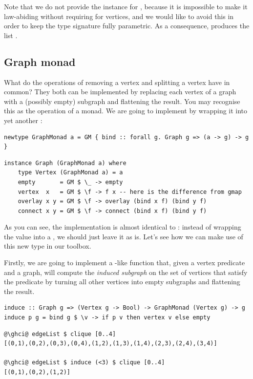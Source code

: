 \noindent
Note that we do not provide the  instance for , because it
is impossible to make it law-abiding without requiring  for vertices,
and we would like to avoid this in order to keep the  type signature
fully parametric. As a consequence,  produces the
list \hs{[1,1]}.

\subsection{Graph monad}\label{sub-monad}

What do the operations of removing a vertex and splitting a vertex have in common?
They both can be implemented by replacing each vertex of a graph with a (possibly empty)
subgraph and flattening the result. You may recognise this as the  operation
of a monad. We are going to implement 
by wrapping it into yet another :

\begin{verbatim}
newtype GraphMonad a = GM { bind :: forall g. Graph g => (a -> g) -> g }
\end{verbatim}
\vspace{1mm}
\begin{verbatim}
instance Graph (GraphMonad a) where
    type Vertex (GraphMonad a) = a
    empty       = GM $ \_ -> empty
    vertex  x   = GM $ \f -> f x -- here is the difference from gmap
    overlay x y = GM $ \f -> overlay (bind x f) (bind y f)
    connect x y = GM $ \f -> connect (bind x f) (bind y f)
\end{verbatim}

As you can see, the implementation is almost identical to : instead of
wrapping the value  into a , we should just leave it as is.
Let's see how we can make use of this new type in our toolbox.

Firstly, we are going to implement a -like function 
that, given a vertex predicate and a graph, will compute the \emph{induced subgraph}
on the set of vertices that satisfy the predicate by turning all other
vertices into empty subgraphs and flattening the result.

\begin{verbatim}
induce :: Graph g => (Vertex g -> Bool) -> GraphMonad (Vertex g) -> g
induce p g = bind g $ \v -> if p v then vertex v else empty
\end{verbatim}
\vspace{1mm}
\begin{verbatim}
@\ghci@ edgeList $ clique [0..4]
[(0,1),(0,2),(0,3),(0,4),(1,2),(1,3),(1,4),(2,3),(2,4),(3,4)]

@\ghci@ edgeList $ induce (<3) $ clique [0..4]
[(0,1),(0,2),(1,2)]
\end{verbatim}

